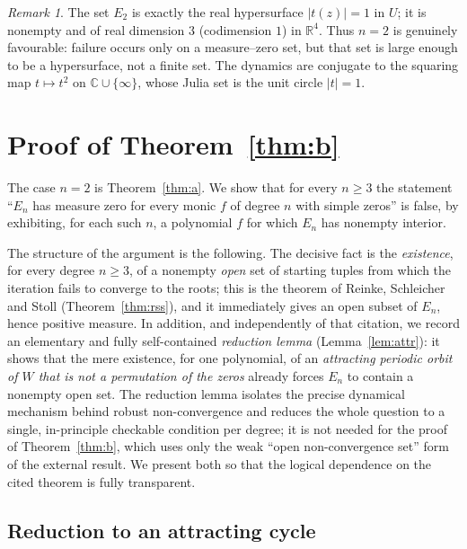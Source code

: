 \documentclass{amsart}
\theoremstyle{definition}
\theoremstyle{remark}
\newtheorem{remark}{Remark}
\newcommand{\C}{\mathbb{C}}
\newcommand{\R}{\mathbb{R}}
\begin{document}
\begin{remark}
The set $E_2$ is exactly the real hypersurface $|t(z)|=1$ in $U$; it is nonempty and of real
dimension $3$ (codimension $1$) in $\R^4$. Thus $n=2$ is genuinely favourable: failure occurs
only on a measure--zero set, but that set is large enough to be a hypersurface, not a finite
set. The dynamics are conjugate to the squaring map $t\mapsto t^2$ on $\C\cup\{\infty\}$,
whose Julia set is the unit circle $|t|=1$.
\end{remark}

\section{Proof of Theorem~\ref{thm:b}}

The case $n=2$ is Theorem~\ref{thm:a}. We show that for every $n\ge3$ the statement
``$E_n$ has measure zero for every monic $f$ of degree $n$ with simple zeros'' is false, by
exhibiting, for each such $n$, a polynomial $f$ for which $E_n$ has nonempty interior.

The structure of the argument is the following. The decisive fact is the \emph{existence},
for every degree $n\ge3$, of a nonempty \emph{open} set of starting tuples from which the
iteration fails to converge to the roots; this is the theorem of Reinke, Schleicher and Stoll
(Theorem~\ref{thm:rss}), and it immediately gives an open subset of $E_n$, hence positive
measure. In addition, and independently of that citation, we record an elementary and fully
self-contained \emph{reduction lemma} (Lemma~\ref{lem:attr}): it shows that the mere
existence, for one polynomial, of an \emph{attracting periodic orbit of $W$ that is not a
permutation of the zeros} already forces $E_n$ to contain a nonempty open set. The reduction
lemma isolates the precise dynamical mechanism behind robust non-convergence and reduces the
whole question to a single, in-principle checkable condition per degree; it is not needed for
the proof of Theorem~\ref{thm:b}, which uses only the weak ``open non-convergence set'' form
of the external result. We present both so that the logical dependence on the cited theorem is
fully transparent.

\subsection{Reduction to an attracting cycle}
\end{document}
